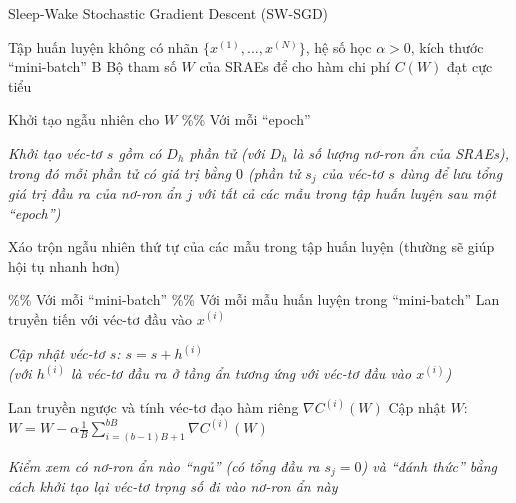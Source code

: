 \begin{algorithm}
	\caption{Sleep-Wake Stochastic Gradient Descent (SW-SGD)}
	\label{alg_SW-SGD}
	\begin{algorithmic}[1]
		\renewcommand{\algorithmicrequire}{\textbf{Đầu vào:}}
		\renewcommand{\algorithmicensure}{\textbf{Đầu ra:}}
		\algnewcommand{}
		\algnewcommand\Operation{\item[\algorithmicoperation]}
		
		\Require Tập huấn luyện không có nhãn $\{x^{(1)},\ldots,x^{(N)}\}$, hệ số học $\alpha>0$, kích thước ``mini-batch'' B
		\Ensure Bộ tham số $W$ của SRAEs để cho hàm chi phí $C(W)$ đạt cực tiểu
		
		\Operation
		\State Khởi tạo ngẫu nhiên cho $W$
		 \%\% Với mỗi ``epoch''
			\State \parbox[t]{\dimexpr\linewidth-\algorithmicindent}{\emph{Khởi tạo véc-tơ $s$ gồm có $D_h$ phần tử (với $D_h$ là số lượng nơ-ron ẩn của SRAEs), trong đó mỗi phần tử có giá trị bằng $0$ (phần tử $s_j$ của véc-tơ $s$ dùng để lưu tổng giá trị đầu ra của nơ-ron ẩn $j$ với tất cả các mẫu trong tập huấn luyện sau một ``epoch'')}\strut}
			\State \parbox[t]{\dimexpr\linewidth-\algorithmicindent}{Xáo trộn ngẫu nhiên thứ tự của các mẫu trong tập huấn luyện (thường sẽ giúp hội tụ nhanh hơn)\strut}
			 \%\% Với mỗi ``mini-batch''
				 \%\% Với mỗi mẫu huấn luyện trong ``mini-batch''
					\State Lan truyền tiến với véc-tơ đầu vào $x^{(i)}$
					\State \parbox[t]{\dimexpr\linewidth-\algorithmicindent}{\emph{Cập nhật véc-tơ $s$: $s = s + h^{(i)}$ \\(với $h^{(i)}$ là véc-tơ đầu ra ở tầng ẩn tương ứng với véc-tơ đầu vào $x^{(i)}$)}\strut}
					\State Lan truyền ngược và tính véc-tơ đạo hàm riêng $\nabla C^{(i)}(W)$
				\EndFor
				\State Cập nhật $W$: $W = W - \alpha \frac{1}{B} \sum_{i=(b-1)B+1}^{bB} \nabla C^{(i)}(W)$ 
			\EndFor
			\State \parbox[t]{\dimexpr\linewidth-\algorithmicindent}{\emph{Kiểm xem có nơ-ron ẩn nào ``ngủ'' (có tổng đầu ra $s_j=0$) và ``đánh thức'' bằng cách khởi tạo lại véc-tơ trọng số đi vào nơ-ron ẩn này}}
		\EndWhile
	\end{algorithmic}
\end{algorithm}

